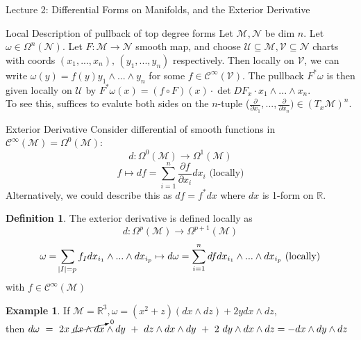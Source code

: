 \documentclass[10pt]{article}
\theoremstyle{plain}
\theoremstyle{definition}
\newtheorem{defn}[thm]{Definition} %
\newtheorem{exmp}[thm]{Example} %
\newcommand{\Real}{\mathbb{R}}
\newcommand{\man}{\mathcal{M}}
\newcommand{\nan}{\mathcal{N}}
\newcommand{\chartU}{\mathcal{U}}
\newcommand{\allthe}[3]{{#1}_{#2},...,{#1}_{#3}}
\newcommand{\allthewedge}[3]{{#1}_{#2}\wedge...\wedge{#1}_{#3}}
\newcommand{\tang}{T_x\man}
\newcommand{\pformman}[1]{\Omega^{#1}(\man)}
\newcommand{\pformnan}[1]{\Omega^{#1}(\nan)}
\newcommand{\iparderiv}[1]{\frac{\partial}{\partial x_{#1}}}
\newcommand{\iparderivof}[2]{\frac{\partial {#2}}{\partial x_{#1}}}
\newcommand{\dx}{dx}
\newcommand{\dy}{dy}
\newcommand{\dz}{dz}
\newcommand{\deriv}{d}
\newcommand{\df}{df}
\newcommand{\dw}{d\omega}
\newcommand{\cts}[1]{\mathcal{C}^{\infty}(#1)}
\newcommand{\sumfromto}[2]{\sum\limits_{#1}^{#2}}
\begin{document}
\begin{section}{Lecture 2: Differential Forms on Manifolds, and the Exterior Derivative}
\begin{subsection}{Local Description of pullback of top degree forms}
Let $\man,\nan$ be dim $n$. Let $\omega \in \pformnan{n}$. Let $F:\man \to \nan$ smooth map, and choose $\chartU \subseteq\man, \mathcal{V} \subseteq\nan$ charts with coords $(\allthe{x}{1}{n}) , \, (\allthe{y}{1}{n})$ respectively. Then locally on $\mathcal{V}$, we can write $\omega(y) = f(y) \allthewedge{y}{1}{n}$ for some $f\in \cts{\mathcal{V}}$. The pullback $F^*\omega$ is then given locally on $\chartU$ by $F^*\omega(x) = (f\circ F)(x) \cdot \det DF_x \cdot \allthewedge{x}{1}{n}.$ \\
To see this, suffices to evalute both sides on the $n$-tuple ($\iparderiv{1},...,\iparderiv{n})\in(\tang)^n$.
\end{subsection}
\begin{subsection}{Exterior Derivative}
Consider differential of smooth functions in $\cts{\man} = \pformman{0}$:
$$\deriv : \pformman{0} \to \pformman{1}$$
$$ f \mapsto \df = \sumfromto{i=1}{n} \iparderivof{i}{f} \dx_i \text{   (locally)}$$
Alternatively, we could describe this as $\df = f^* \dx$ where $\dx$ is 1-form on $\Real$.
\begin{defn}
The exterior derivative is defined locally as
$$\deriv : \pformman{p} \to \pformman{p+1}$$
$$ \omega = \sum\limits_{\abs{I} = p} f_I \allthewedge{dx}{i_1}{i_p}\mapsto \dw = \sumfromto{i=1}{n} \df \allthewedge{dx}{i_1}{i_p} \text{   (locally)}$$
with $f\in\cts{\man}$
\end{defn}
\begin{exmp}
If $\man = \Real^3, \omega = (x^2 + z)(\dx\wedge\dz) + 2y\dx\wedge\dz$,\\ then $\dw~=~2x~\cancelto{0}{\dx\wedge\dx}\wedge\dy~+~\dz\wedge\dx\wedge\dy~+~2~\dy\wedge\dx\wedge\dz = - \dx\wedge\dy\wedge\dz $
\end{exmp}


\end{subsection}
\end{section}
\end{document}
